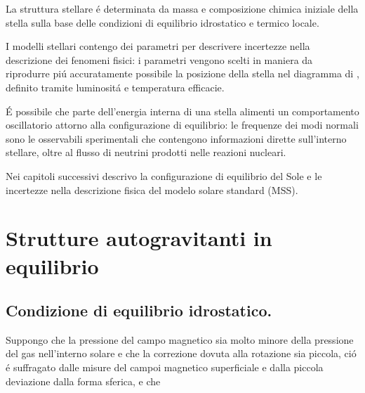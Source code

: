 \documentclass[../main.tex]{subfiles}
\begin{document}
La struttura stellare \'e determinata da massa e composizione chimica iniziale della stella sulla base delle condizioni di equilibrio idrostatico e termico locale.


I modelli stellari contengo dei parametri per descrivere incertezze nella descrizione dei fenomeni fisici: i parametri vengono scelti in maniera da riprodurre pi\'u accuratamente possibile la posizione della stella nel diagramma di \hr{}, definito tramite luminosit\'a e temperatura efficacie.


\'E possibile che parte dell'energia interna di una stella alimenti un comportamento oscillatorio attorno alla configurazione di equilibrio: le frequenze dei modi normali sono le osservabili sperimentali che contengono informazioni dirette sull'interno stellare, oltre al flusso di neutrini prodotti nelle reazioni nucleari.

 Nei capitoli successivi descrivo la configurazione di equilibrio del Sole e le incertezze nella descrizione fisica del modelo solare standard (MSS).


\clearpage


{\let\clearpage\relax \chapter{Strutture autogravitanti in equilibrio}}


\section{Condizione di equilibrio idrostatico.}

Suppongo che la pressione del campo magnetico sia molto minore della pressione del gas nell'interno solare e che la correzione dovuta alla rotazione sia piccola, ci\'o \'e suffragato dalle misure del campoi magnetico superficiale e dalla piccola deviazione dalla forma sferica, e che 
\end{document}
